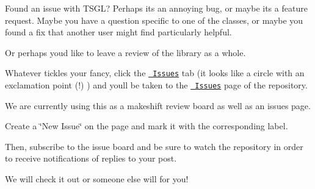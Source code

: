Found an issue with T\+S\+GL? Perhaps it\textquotesingle{}s an annoying bug, or maybe it\textquotesingle{}s a feature request. Maybe you have a question specific to one of the classes, or maybe you found a fix that another user might find particularly helpful.

Or perhaps you\textquotesingle{}d like to leave a review of the library as a whole.

Whatever tickles your fancy, click the \href{https://github.com/Calvin-CS/TSGL/issues}{\texttt{ Issues}} tab (it looks like a circle with an exclamation point (!) ) and you\textquotesingle{}ll be taken to the \href{https://github.com/Calvin-CS/TSGL/issues}{\texttt{ Issues}} page of the repository.

We are currently using this as a makeshift review board as well as an issues page.

Create a \char`\"{}\+New Issue\char`\"{} on the page and mark it with the corresponding label.

Then, subscribe to the issue board and be sure to watch the repository in order to receive notifications of replies to your post.

We will check it out or someone else will for you! 